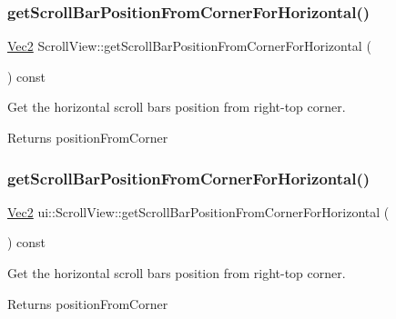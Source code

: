 \subsubsection{\texorpdfstring{get\+Scroll\+Bar\+Position\+From\+Corner\+For\+Horizontal()}{getScrollBarPositionFromCornerForHorizontal()}\hspace{0.1cm}{\footnotesize\ttfamily [1/2]}}
{\footnotesize\ttfamily \hyperlink{classVec2}{Vec2} Scroll\+View\+::get\+Scroll\+Bar\+Position\+From\+Corner\+For\+Horizontal (\begin{DoxyParamCaption}{ }\end{DoxyParamCaption}) const}



Get the horizontal scroll bar\textquotesingle{}s position from right-\/top corner. 

\begin{DoxyReturn}{Returns}
position\+From\+Corner 
\end{DoxyReturn}
\mbox{\label{classui_1_1ScrollView_a0c4831dff761f1d878f46f4b781d1e54}} 
\subsubsection{\texorpdfstring{get\+Scroll\+Bar\+Position\+From\+Corner\+For\+Horizontal()}{getScrollBarPositionFromCornerForHorizontal()}\hspace{0.1cm}{\footnotesize\ttfamily [2/2]}}
{\footnotesize\ttfamily \hyperlink{classVec2}{Vec2} ui\+::\+Scroll\+View\+::get\+Scroll\+Bar\+Position\+From\+Corner\+For\+Horizontal (\begin{DoxyParamCaption}{ }\end{DoxyParamCaption}) const}



Get the horizontal scroll bar\textquotesingle{}s position from right-\/top corner. 

\begin{DoxyReturn}{Returns}
position\+From\+Corner 
\end{DoxyReturn}
\mbox{\label{classui_1_1ScrollView_ae0e198b5b9ee2fd086f1b84a08db3e29}} 
